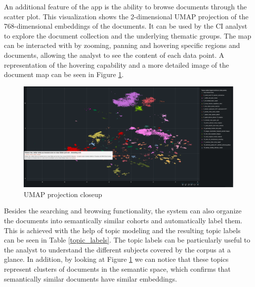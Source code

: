 \documentclass[a4paper]{article}
\begin{document}
An additional feature of the app is the ability to browse documents through the scatter plot. This visualization shows the 2-dimensional UMAP projection of the 768-dimensional embeddings of the documents. It can be used by the CI analyst to explore the document collection and the underlying thematic groups. The map can be interacted with by zooming, panning and hovering specific regions and documents, allowing the analyst to see the content of each data point. A representation of the hovering capability and a more detailed image of the document map can be seen in Figure \ref{app_map}.

\begin{figure}[H]
  \centering
  \includegraphics[scale=0.3]{./assets/map_screenshot}
  \caption{UMAP projection closeup}
  \label{app_map}
\end{figure}

Besides the searching and browsing functionality, the system can also organize the documents into semantically similar cohorts and automatically label them. This is achieved with the help of topic modeling and the resulting topic labels can be seen in Table \ref{topic_labels}. The topic labels can be particularly useful to the analyst to understand the different subjects covered by the corpus at a glance. In addition, by looking at Figure \ref{app_map} we can notice that these topics represent clusters of documents in the semantic space, which confirms that semantically similar documents have similar embeddings. 
\end{document}
